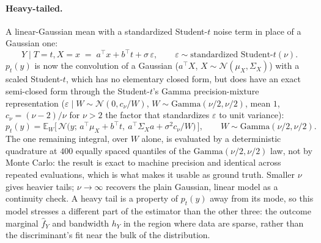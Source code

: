 \documentclass[11pt]{article}
\theoremstyle{plain}
\theoremstyle{definition}
\theoremstyle{remark}
\newcommand{\pE}{\ensuremath{\mathbb{E}}}
\begin{document}
\paragraph{Heavy-tailed.} A linear-Gaussian mean with a standardized Student-$t$ noise term in
place of a Gaussian one:
\begin{equation}
Y \mid T=t,X=x \;=\; a^\top x + b^\top t + \sigma\,\varepsilon, \qquad
\varepsilon \sim \text{standardized Student-}t(\nu).
\label{eq:app-dgp-heavytail}
\end{equation}
$p_t(y)$ is now the convolution of a Gaussian ($a^\top X$, $X\sim\mathcal N(\mu_X,\Sigma_X)$) with
a scaled Student-$t$, which has no elementary closed form, but does have an exact semi-closed form
through the Student-$t$'s Gamma precision-mixture representation
($\varepsilon\mid W \sim \mathcal N(0,c_\nu/W)$, $W \sim \mathrm{Gamma}(\nu/2,\nu/2)$, mean $1$,
$c_\nu = (\nu-2)/\nu$ for $\nu>2$ the factor that standardizes $\varepsilon$ to unit variance):
\begin{equation}
p_t(y) = \pE_W\Big[\, \mathcal N\big(y;\, a^\top\mu_X + b^\top t,\ a^\top\Sigma_X a + \sigma^2
c_\nu / W \big) \,\Big], \qquad W \sim \mathrm{Gamma}(\nu/2,\nu/2).
\label{eq:app-dgp-heavytail-density}
\end{equation}
The one remaining integral, over $W$ alone, is evaluated by a deterministic quadrature at $400$
equally spaced quantiles of the $\mathrm{Gamma}(\nu/2,\nu/2)$ law, not by Monte Carlo: the result
is exact to machine precision and identical across repeated evaluations, which is what makes it
usable as ground truth. Smaller $\nu$ gives heavier tails; $\nu\to\infty$ recovers the plain
Gaussian, linear model as a continuity check. A heavy tail is a property of $p_t(y)$ away from its
mode, so this model stresses a different part of the estimator than the other three: the outcome
marginal $\widehat f_Y$ and bandwidth $h_Y$ in the region where data are sparse, rather than the
discriminant's fit near the bulk of the distribution.
\end{document}
